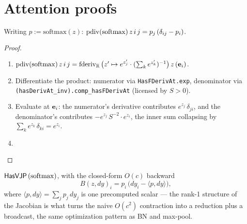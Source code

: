 \section{Attention proofs}
\label{sec:attention_proofs}





\begin{theorem}
  \label{ax:pdiv_softmax}
  \leanok
  Writing \(p := \mathrm{softmax}(z)\):
  \Prove{}
  \(\operatorname{pdiv}(\mathrm{softmax})\, z\, i\, j = p_j\, (\delta_{ij} - p_i)\).
\end{theorem}

\begin{proof}
\leanok
\begin{enumerate}
  \item \(\operatorname{pdiv}(\mathrm{softmax})\, z\, i\, j
    = \operatorname{fderiv}_{\mathbb{R}}\,\bigl(z' \mapsto e^{z'_j} \cdot
      (\textstyle\sum_k e^{z'_k})^{-1}\bigr)\, z\, (\mathbf{e}_i)\).
  \item Differentiate the product: numerator via
    \texttt{HasFDerivAt.exp}, denominator via
    \texttt{(hasDerivAt\_inv).comp\_hasFDerivAt} (licensed by
    \(S > 0\)).
  \item Evaluate at \(\mathbf{e}_i\): the numerator's derivative
    contributes \(e^{z_j}\, \delta_{ji}\), and the denominator's
    contributes \(-e^{z_j}\, S^{-2} \cdot e^{z_i}\), the inner sum
    collapsing by \(\sum_k e^{z_k}\, \delta_{ki} = e^{z_i}\).
  \item \Qed{}
\end{enumerate}
\end{proof}

\begin{theorem}
  \label{thm:softmaxHasVJP}
  \leanok
  \(\mathsf{HasVJP}\, (\mathrm{softmax})\), with the closed-form
  \(O(c)\) backward
  \[
    B(z, dy)_i = p_i\, \bigl(dy_i - \langle p, dy \rangle\bigr),
  \]
  where \(\langle p, dy \rangle = \sum_j p_j\, dy_j\) is one
  precomputed scalar --- the rank-1 structure of the Jacobian is what
  turns the naive \(O(c^2)\) contraction into a reduction plus a
  broadcast, the same optimization pattern as BN and max-pool.
\end{theorem}

